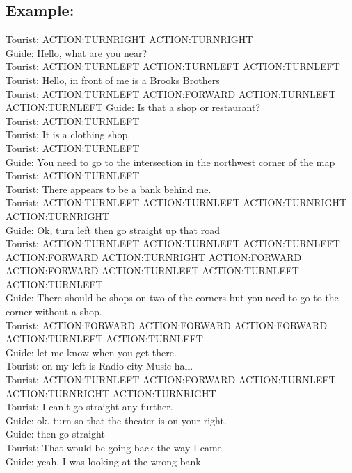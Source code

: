 \subsection*{Example:}
Tourist: ACTION:TURNRIGHT ACTION:TURNRIGHT\\ 
Guide: Hello, what are you near?\\ 
Tourist: ACTION:TURNLEFT ACTION:TURNLEFT ACTION:TURNLEFT\\ 
Tourist: Hello, in front of me is a Brooks Brothers \\
Tourist: ACTION:TURNLEFT ACTION:FORWARD ACTION:TURNLEFT ACTION:TURNLEFT 
Guide: Is that a shop or restaurant? \\
Tourist: ACTION:TURNLEFT \\
Tourist: It is a clothing shop.\\ 
Tourist: ACTION:TURNLEFT \\
Guide: You need to go to the intersection in the northwest corner of the map\\ Tourist: ACTION:TURNLEFT\\ 
Tourist: There appears to be a bank behind me.\\ 
Tourist: ACTION:TURNLEFT ACTION:TURNLEFT ACTION:TURNRIGHT ACTION:TURNRIGHT\\ Guide: Ok, turn left then go straight up that road \\
Tourist: ACTION:TURNLEFT ACTION:TURNLEFT ACTION:TURNLEFT ACTION:FORWARD ACTION:TURNRIGHT ACTION:FORWARD ACTION:FORWARD ACTION:TURNLEFT ACTION:TURNLEFT ACTION:TURNLEFT \\
Guide: There should be shops on two of the corners but you need to go to the corner without a shop.\\ 
Tourist: ACTION:FORWARD ACTION:FORWARD ACTION:FORWARD ACTION:TURNLEFT ACTION:TURNLEFT\\ 
Guide: let me know when you get there. \\
Tourist: on my left is Radio city Music hall.\\
Tourist: ACTION:TURNLEFT ACTION:FORWARD ACTION:TURNLEFT ACTION:TURNRIGHT ACTION:TURNRIGHT \\
Tourist: I can’t go straight any further.\\ 
Guide: ok. turn so that the theater is on your right.\\ 
Guide: then go straight \\
Tourist: That would be going back the way I came \\
Guide: yeah. I was looking at the wrong bank \\
